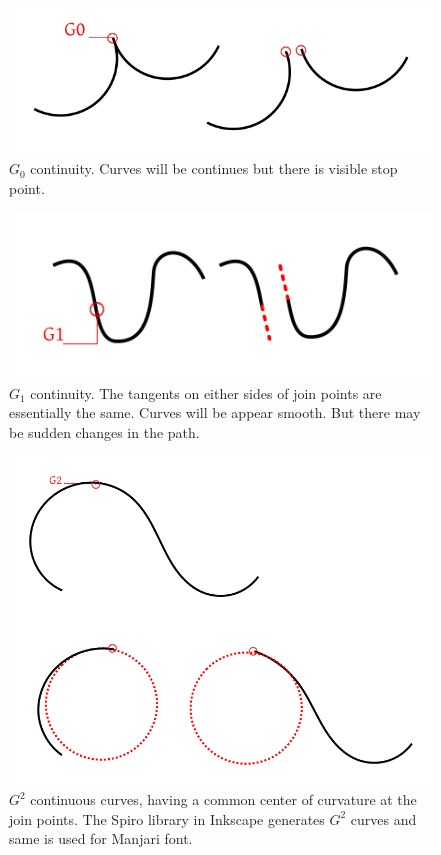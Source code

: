 \documentclass[11pt,twoside,a4paper]{article}
\begin{document}
\begin{figure}[h!]
	\includegraphics[width=1.0\textwidth]{images/g0.png}
	\caption{$G_0$ continuity. Curves will be continues but there is visible stop point.}
	\label{g0}
\end{figure}

\begin{figure}[h!]
	\includegraphics[width=1.0\textwidth]{images/g1.png}
	\caption{$G_1$ continuity. The tangents on either sides of join points are essentially the same. Curves will be appear smooth. But there may be sudden changes in the path.}
	\label{g1}
\end{figure}

\begin{figure}[h!]
	\includegraphics[width=1.0\textwidth]{images/g2.png}
	\caption{$G^2$ continuous curves, having a common center of curvature at the join points. The Spiro library in Inkscape generates $G^2$ curves and same is used for Manjari font.}
	\label{g2}
\end{figure}
\end{document}
